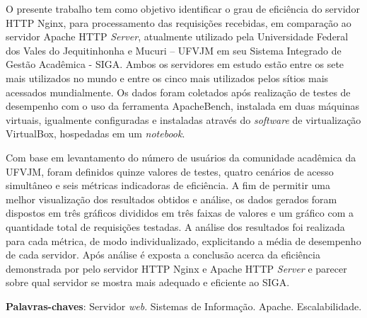 \setlength{\absparsep}{18pt} %
\begin{resumo}
O presente trabalho tem como objetivo identificar o grau de eficiência do 
servidor HTTP Nginx, para processamento das requisições recebidas, em 
comparação ao servidor Apache HTTP \textit{Server}, atualmente utilizado pela 
Universidade Federal dos Vales do Jequitinhonha e Mucuri – UFVJM em seu Sistema 
Integrado de Gestão Acadêmica - SIGA. Ambos os servidores em estudo estão entre 
os sete mais utilizados no mundo e entre os cinco mais utilizados pelos sítios 
mais acessados mundialmente. Os dados foram coletados após realização de testes 
de desempenho com o uso da ferramenta ApacheBench, instalada em duas máquinas 
virtuais, igualmente configuradas e instaladas através do \textit{software} de 
virtualização VirtualBox, hospedadas em um \textit{notebook}.

Com base em levantamento do número de usuários da comunidade acadêmica da 
UFVJM, foram definidos quinze valores de testes, quatro cenários  de acesso 
simultâneo e seis métricas indicadoras de eficiência. A fim de permitir uma 
melhor visualização dos resultados obtidos e análise, os dados gerados foram 
dispostos em três gráficos divididos em três faixas de valores e um gráfico com 
a quantidade total de requisições testadas. A análise dos resultados foi 
realizada para cada métrica, de modo individualizado, explicitando a média de 
desempenho de cada servidor. Após análise é exposta a conclusão acerca da 
eficiência demonstrada por pelo servidor HTTP Nginx e Apache HTTP 
\textit{Server} e 
parecer sobre  qual servidor se mostra  mais adequado e eficiente ao SIGA.


 \textbf{Palavras-chaves}: Servidor \textit{web}. Sistemas de Informação. 
 Apache. Escalabilidade.
\end{resumo}